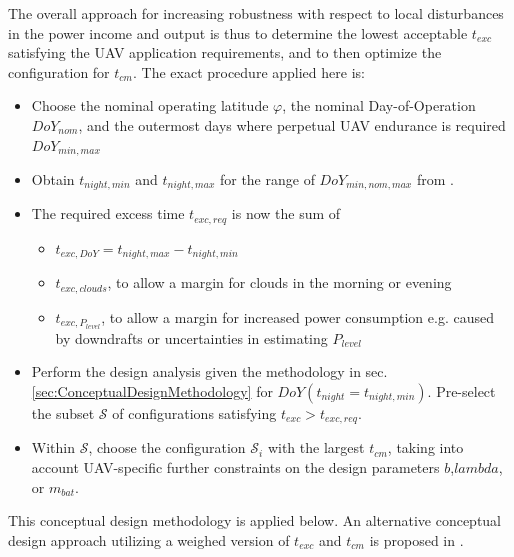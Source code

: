 The overall approach for increasing robustness with respect to local disturbances in the power income and output is thus to determine the lowest acceptable $t_{exc}$ satisfying the UAV application requirements, and to then optimize the configuration for $t_{cm}$. The exact procedure applied here is:
\begin{itemize}
\item Choose the nominal operating latitude $\varphi$, the nominal Day-of-Operation $DoY_{nom}$, and the outermost days where perpetual UAV endurance is required $DoY_{min,max}$
\item Obtain $t_{night,min}$ and $t_{night,max}$ for the range of $DoY_{min,nom,max}$ from \cite{Duffie_SolarEngineering}. 
\item The required excess time $t_{exc,req}$ is now the sum of 
\begin{itemize}
	\item $t_{exc,DoY} = t_{night,max}-t_{night,min}$
	\item $t_{exc,clouds}$, to allow a margin for clouds in the morning or evening
	\item $t_{exc,P_{level}}$, to allow a margin for increased power consumption e.g. caused by downdrafts or uncertainties in estimating $P_{level}$
\end{itemize}
\item Perform the design analysis given the methodology in sec. \ref{sec:ConceptualDesignMethodology} for $DoY(t_{night}=t_{night,min})$. Pre-select the subset $\mathcal{S}$ of configurations satisfying $t_{exc}>t_{exc,req}$.
\item Within $\mathcal{S}$, choose the configuration $\mathcal{S}_i$ with the largest $t_{cm}$, taking into account UAV-specific further constraints on the design parameters $b$,$lambda$, or $m_{bat}$.
\end{itemize}

This conceptual design methodology is applied below. An alternative conceptual design approach utilizing a weighed version of $t_{exc}$ and $t_{cm}$ is proposed in \cite{Morton_ICRA2013}. 

 
